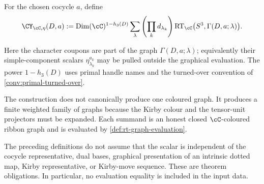 \begin{definition}
\label{def:role-aware-handle-evaluator}
For the chosen cocycle $a$, define
\[
  \CY_{\cC,\eta}(D,a)
  :=
  \operatorname{Dim}(\cC)^{1-h_3(D)}
  \sum_{\lambda}
    \left(\prod_k d_{\lambda_k}\right)
    \operatorname{RT}_{\cC}
      \bigl(S^3,\Gamma(D,a;\lambda)\bigr).
\]
\end{definition}

\begin{remark}
\label{rem:handle-evaluator-conventions}
Here the character coupons are part of the graph
$\Gamma(D,a;\lambda)$; equivalently their simple-component scalars
$\eta_{\lambda_k}^{a_k}$ may be pulled outside the graphical evaluation.
The power $1-h_3(D)$ uses primal handle names and the turned-over convention
of \cref{conv:primal-turned-over}.
\end{remark}

\begin{remark}
\label{rem:evaluator-finite-sum}
The construction does not canonically produce one coloured graph.  It
produces a finite weighted family of graphs because the Kirby colour and the
tensor-unit projectors must be expanded.  Each summand is an honest closed
$\cC$-coloured ribbon graph and is evaluated by
\cref{def:rt-graph-evaluation}.
\end{remark}

\begin{remark}
\label{rem:evaluator-proof-obligations}
The preceding definitions do not assume that the scalar is independent of
the cocycle representative, dual bases, graphical presentation of an
intrinsic dotted map, Kirby representative, or Kirby-move sequence.  These
are theorem obligations.  In particular, no evaluation equality is included
in the input data.
\end{remark}
